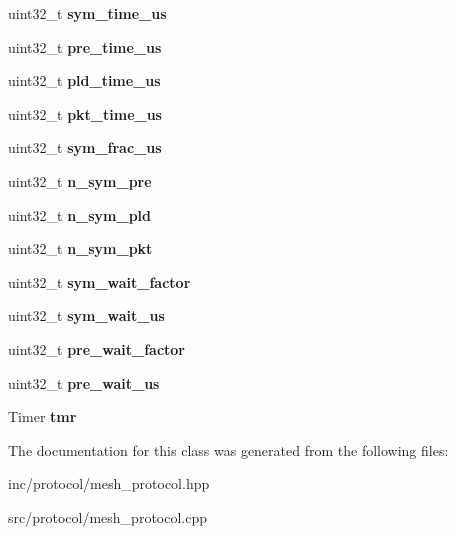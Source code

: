 \begin{DoxyCompactItemize}
uint32\+\_\+t {\bfseries sym\+\_\+time\+\_\+us}
\item 
\mbox{\label{classRadioTiming_a08dd97045580ced34fc273ea4a70b5a5}} 
uint32\+\_\+t {\bfseries pre\+\_\+time\+\_\+us}
\item 
\mbox{\label{classRadioTiming_ab5e0df9c2b1eda8fdc63c871c005ea92}} 
uint32\+\_\+t {\bfseries pld\+\_\+time\+\_\+us}
\item 
\mbox{\label{classRadioTiming_a754e188f6b7f7c35758a2772921b2772}} 
uint32\+\_\+t {\bfseries pkt\+\_\+time\+\_\+us}
\item 
\mbox{\label{classRadioTiming_adb8ac7bfc6a47573783f81e2e73f6f19}} 
uint32\+\_\+t {\bfseries sym\+\_\+frac\+\_\+us}
\item 
\mbox{\label{classRadioTiming_aaf4435d9eea1188f33cc4ee721d50aca}} 
uint32\+\_\+t {\bfseries n\+\_\+sym\+\_\+pre}
\item 
\mbox{\label{classRadioTiming_a45c73aab6fb2f5c99f7976719f645abf}} 
uint32\+\_\+t {\bfseries n\+\_\+sym\+\_\+pld}
\item 
\mbox{\label{classRadioTiming_af93a55972434e013e09fadcd311381ab}} 
uint32\+\_\+t {\bfseries n\+\_\+sym\+\_\+pkt}
\item 
\mbox{\label{classRadioTiming_a67b79a8285adbcaf5dbc816dbf744f2b}} 
uint32\+\_\+t {\bfseries sym\+\_\+wait\+\_\+factor}
\item 
\mbox{\label{classRadioTiming_aba1eba0435a7dc3d3103e40a30086b9e}} 
uint32\+\_\+t {\bfseries sym\+\_\+wait\+\_\+us}
\item 
\mbox{\label{classRadioTiming_a63d388c95d8eff525d12c199d6bd59fe}} 
uint32\+\_\+t {\bfseries pre\+\_\+wait\+\_\+factor}
\item 
\mbox{\label{classRadioTiming_ae1c4611a8d342a27c11d7b6f7adcb6a9}} 
uint32\+\_\+t {\bfseries pre\+\_\+wait\+\_\+us}
\item 
\mbox{\label{classRadioTiming_a682b2b5c537f20be8668d76dbed42db9}} 
Timer {\bfseries tmr}
\end{DoxyCompactItemize}


The documentation for this class was generated from the following files\+:\begin{DoxyCompactItemize}
\item 
inc/protocol/mesh\+\_\+protocol.\+hpp\item 
src/protocol/mesh\+\_\+protocol.\+cpp\end{DoxyCompactItemize}
